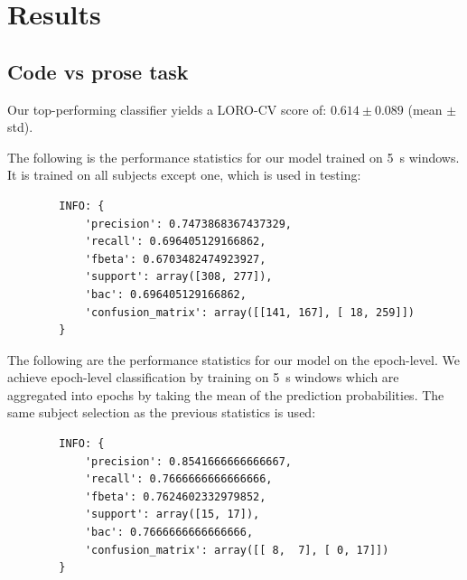 \chapter{Results}


    \section{Code vs prose task}

        Our top-performing classifier yields a LORO-CV score of: $0.614 \pm 0.089$ (mean $\pm$ std).

        The following is the performance statistics for our model trained on \SI{5}{\second} windows. It is trained on all subjects except one, which is used in testing:

        \begin{verbatim}
        INFO: {
            'precision': 0.7473868367437329, 
            'recall': 0.696405129166862, 
            'fbeta': 0.6703482474923927, 
            'support': array([308, 277]), 
            'bac': 0.696405129166862, 
            'confusion_matrix': array([[141, 167], [ 18, 259]])
        }
        \end{verbatim}

        The following are the performance statistics for our model on the epoch-level. We achieve epoch-level classification by training on \SI{5}{\second} windows which are aggregated into epochs by taking the mean of the prediction probabilities. The same subject selection as the previous statistics is used:


        \begin{verbatim}
        INFO: {
            'precision': 0.8541666666666667, 
            'recall': 0.7666666666666666, 
            'fbeta': 0.7624602332979852, 
            'support': array([15, 17]), 
            'bac': 0.7666666666666666, 
            'confusion_matrix': array([[ 8,  7], [ 0, 17]])
        }
        \end{verbatim}

